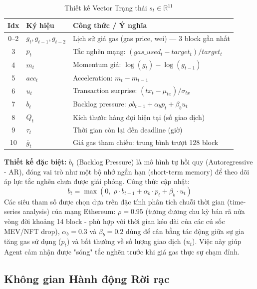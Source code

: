 \begin{table}[H]
\centering
\caption{Thiết kế Vector Trạng thái $s_t \in \mathbb{R}^{11}$}
\begin{tabular}{clp{7.5cm}}
\hline
\textbf{Idx} & \textbf{Ký hiệu} & \textbf{Công thức / Ý nghĩa} \\
\hline
0--2 & $g_t, g_{t-1}, g_{t-2}$ & Lịch sử giá gas (gas price, wei) — 3 block gần nhất \\
3    & $p_t$                   & Tắc nghẽn mạng: $(gas\_used_t - target_t)/target_t$ \\
4    & $m_t$                   & Momentum giá: $\log(g_t) - \log(g_{t-1})$ \\
5    & $acc_t$                 & Acceleration: $m_t - m_{t-1}$ \\
6    & $u_t$                   & Transaction surprise: $(tx_t - \mu_{tx})/\sigma_{tx}$ \\
7    & $b_t$                   & Backlog pressure: $\rho b_{t-1} + \alpha_b p_t + \beta_b u_t$ \\
8    & $Q_t$                   & Kích thước hàng đợi hiện tại (số giao dịch) \\
9    & $\tau_t$                & Thời gian còn lại đến deadline (giờ) \\
10   & $\bar{g}_t$             & Giá gas tham chiếu: trung bình trượt 128 block \\
\hline
\end{tabular}
\label{tab:state}
\end{table}

\textbf{Thiết kế đặc biệt:} $b_t$ (Backlog Pressure) là mô hình tự hồi quy (Autoregressive - AR), đóng vai trò như một bộ nhớ ngắn hạn (short-term memory) để theo dõi áp lực tắc nghẽn chưa được giải phóng. Công thức cập nhật:
\begin{equation}
    b_t = \max(0, \; \rho\cdot b_{t-1} + \alpha_b\cdot p_t + \beta_b\cdot u_t)
\end{equation}
Các siêu tham số được chọn dựa trên đặc tính phân tích chuỗi thời gian (time-series analysis) của mạng Ethereum: $\rho=0.95$ (tương đương chu kỳ bán rã nửa vòng đời khoảng 14 block - phù hợp với thời gian kéo dài của các cú sốc MEV/NFT drop), $\alpha_b=0.3$ và $\beta_b=0.2$ dùng để cân bằng tác động giữa sự gia tăng gas sử dụng ($p_t$) và bất thường về số lượng giao dịch ($u_t$). Việc này giúp Agent cảm nhận được "sóng" tắc nghẽn trước khi giá gas thực sự chạm đỉnh.

\subsection{Không gian Hành động Rời rạc}


